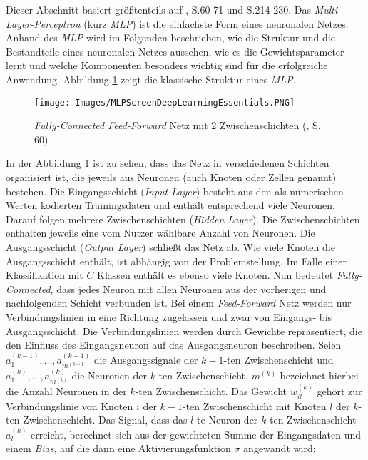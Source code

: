 \documentclass[a4paper,11pt]{article}
\begin{document}
Dieser Abschnitt basiert größtenteils auf \cite{deepEssentials}, S.60-71 und S.214-230. %
Das \textit{Multi-Layer-Perceptron} (kurz \textit{MLP}) ist die einfachste Form eines neuronalen Netzes. Anhand des \textit{MLP} wird im Folgenden beschrieben, wie die Struktur und die Bestandteile eines neuronalen Netzes aussehen, wie es die Gewichtsparameter lernt und welche Komponenten besonders wichtig sind für die erfolgreiche Anwendung. Abbildung \ref{abb:MLPScreen} zeigt die klassische Struktur eines \textit{MLP}.


\begin{figure}[!ht]
\begin{center}
\texttt{[image: Images/MLPScreenDeepLearningEssentials.PNG]}
\caption{\textit{Fully-Connected Feed-Forward} Netz mit 2 Zwischenschichten (\cite{deepEssentials}, S. 60)}
\label{abb:MLPScreen}
\end{center}
\end{figure}

In der Abbildung \ref{abb:MLPScreen} ist zu sehen, dass das Netz in verschiedenen Schichten organisiert ist, die jeweils aus Neuronen (auch Knoten oder Zellen genannt) bestehen. Die Eingangsschicht (\textit{Input Layer}) besteht aus den als numerischen Werten kodierten Trainingsdaten und enthält entsprechend viele Neuronen. Darauf folgen mehrere Zwischenschichten (\textit{Hidden Layer}). Die Zwischenschichten enthalten jeweils eine vom Nutzer wählbare Anzahl von Neuronen. Die Ausgangsschicht (\textit{Output Layer}) schließt das Netz ab. Wie viele Knoten die Ausgangsschicht enthält, ist abhängig von der Problemstellung. Im Falle einer Klassifikation mit $C$ Klassen enthält es ebenso viele Knoten. Nun bedeutet \textit{Fully-Connected}, dass jedes Neuron mit allen Neuronen aus der vorherigen und nachfolgenden Schicht verbunden ist. Bei einem \textit{Feed-Forward} Netz werden nur Verbindungslinien in eine Richtung zugelassen und zwar von Eingangs- bis Ausgangsschicht. Die Verbindungslinien werden durch Gewichte repräsentiert, die den Einfluss des Eingangsneuron auf das Ausgangsneuron beschreiben. Seien $a_1^{(k-1)},..., a_{m^{(k-1)}}^{(k-1)}$ die Ausgangssignale der $k-1$-ten Zwischenschicht und $a_{1}^{(k)},..., a_{m^{(k)}}^{(k)}$ die Neuronen der $k$-ten Zwischenschicht. $m^{(k)}$ bezeichnet hierbei die Anzahl Neuronen in der $k$-ten Zwischenschicht. 
Das Gewicht $w_{il}^{(k)}$ gehört zur Verbindungslinie von Knoten $i$ der $k-1$-ten Zwischenschicht mit Knoten $l$ der $k$-ten Zwischenschicht. Das Signal, dass das $l$-te Neuron der $k$-ten Zwischenschicht $a_{l}^{(k)}$ erreicht, berechnet sich aus der gewichteten Summe der Eingangsdaten und einem \textit{Bias}, auf die dann eine Aktivierungsfunktion $\sigma$ angewandt wird:
\end{document}
